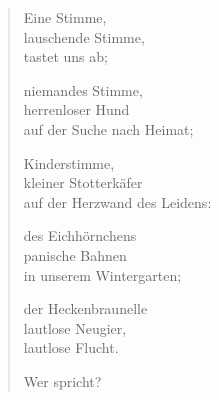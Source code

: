 

\begin{verse}
Eine Stimme,\\
lauschende Stimme,\\
tastet uns ab;

niemandes Stimme,\\
herrenloser Hund\\
auf der Suche nach Heimat;

Kinderstimme,\\
kleiner Stotterkäfer\\
auf der Herzwand des Leidens:

des Eichhörnchens\\
panische Bahnen\\
in unserem Wintergarten;

der Heckenbraunelle\\
lautlose Neugier,\\
lautlose Flucht.

Wer spricht?
\end{verse}
